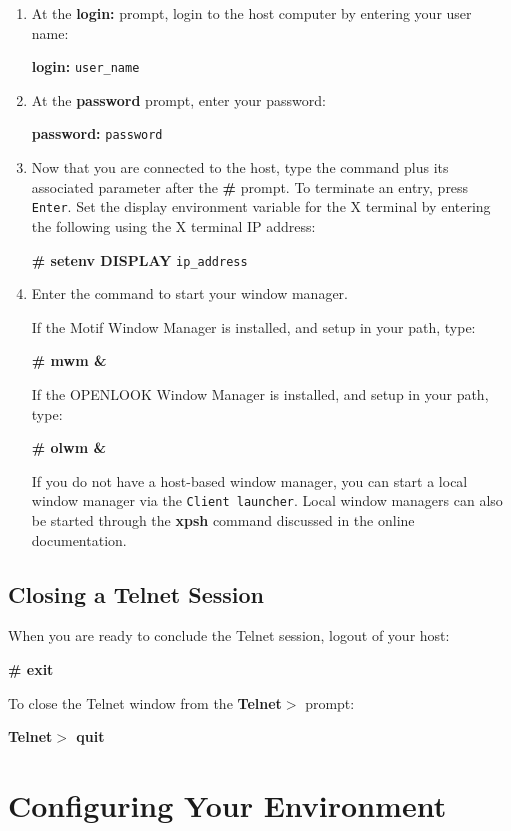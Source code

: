 \begin {enumerate}

\item At the {\bf login:} prompt, login to the host computer by entering your
user name:

{\bf login:} {\tt user\_name}

\item At the {\bf password} prompt, enter your password:

{\bf password:} {\tt password}

\item Now that you are connected to the host, type the command plus its
associated parameter after the {\bf \#} prompt. To terminate an entry, press
{\tt Enter}. Set the display environment variable for the X terminal by entering
the following using the X terminal IP address:

{\bf \# setenv DISPLAY} {\tt ip\_address}

\item Enter the command to start your window manager.

If the Motif Window Manager is installed, and setup in your path, type:

{\bf \# mwm \&}

If the OPENLOOK Window Manager is installed, and setup in your path, type:

{\bf \# olwm \&}

If you do not have a host-based window manager, you can start a local window
manager via the {\tt Client launcher}. Local window managers can also be started
through the {\bf xpsh} command discussed in the online documentation.

\end {enumerate}


\subsection {Closing a Telnet Session}

When you are ready to conclude the Telnet session, logout of your host:

{\bf \# exit}

To close the Telnet window from the {\bf Telnet$>$} prompt:

{\bf Telnet$>$ quit}


\section {Configuring Your Environment}

